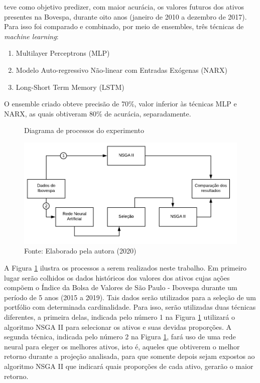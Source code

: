 \documentclass[11pt]{article}
\begin{document}
     teve como objetivo predizer, com maior acurácia, os valores futuros dos ativos presentes na Bovespa, durante oito anos (janeiro de 2010 a dezembro de 2017). Para isso foi comparado e combinado, por meio de ensembles, três técnicas de \textit{machine learning}:
    \begin{enumerate}
        \item Multilayer Perceptrons (MLP)
        \item Modelo Auto-regressivo Não-linear com Entradas Exógenas (NARX)
        \item Long-Short Term Memory (LSTM)
    \end{enumerate}
    O ensemble criado obteve precisão de 70\%, valor inferior às técnicas MLP e NARX, as quais obtiveram 80\% de acurácia, separadamente.
    
   
   \begin{figure}
       \centering
       \caption{Diagrama de processos do experimento}
       \includegraphics[scale=.5]{figuras/Diagrama_tcc_1.png}
       \caption*{Fonte: Elaborado pela autora (2020)}
       \label{fig:diagrama_processos}
   \end{figure}
   
   A Figura \ref{fig:diagrama_processos} ilustra os processos a serem realizados neste trabalho. Em primeiro lugar serão colhidos os dados históricos dos valores dos ativos cujas ações compõem o Índice da Bolsa de Valores de São Paulo - Ibovespa durante um período de 5 anos (2015 a 2019). Tais dados serão utilizados para a seleção de um portfólio com determinada cardinalidade. Para isso, serão utilizadas duas técnicas diferentes, a primeira delas, indicada pelo número 1 na Figura \ref{fig:diagrama_processos} utilizará o algoritmo NSGA II para selecionar os ativos e suas devidas proporções. A segunda técnica, indicada pelo número 2 na Figura \ref{fig:diagrama_processos}, fará uso de uma rede neural para eleger os melhores ativos, isto é, aqueles que obtiverem o melhor retorno durante a projeção analisada, para que somente depois sejam expostos ao algoritmo NSGA II que indicará quais proporções de cada ativo, gerarão o maior retorno. 
   
\end{document}
